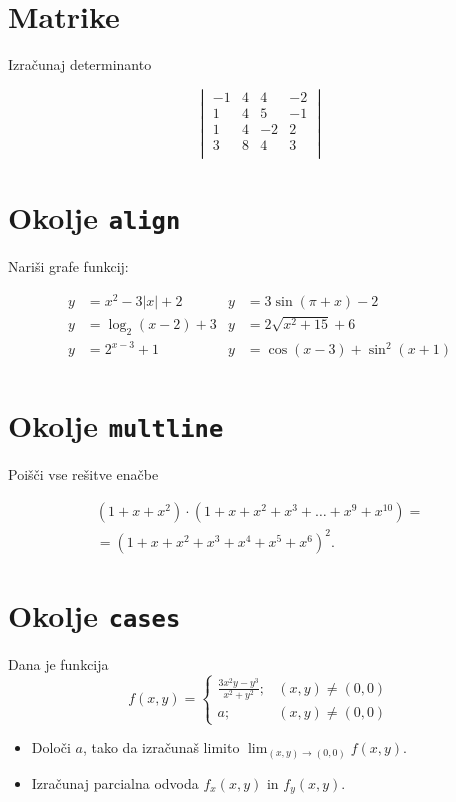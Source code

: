 \documentclass[a4paper,12pt]{article}
\begin{document}
\section*{Matrike}
Izračunaj determinanto
 
 \[\begin{vmatrix}
    -1 & 4 & 4 & -2 \\
    1 & 4 & 5 & -1 \\
    1 & 4 & -2 & 2 \\
    3 & 8 & 4 & 3 \\
 \end{vmatrix}\]
\section*{Okolje \texttt{align}}
Nariši grafe funkcij:


\begin{align*}
   y &= x^2 - 3|x| + 2    & y &= 3 \sin(\pi+x) - 2\\
   y &= \log_2(x-2) + 3   & y &= 2 \sqrt{x^2+15} + 6\\
   y &= 2^{x-3} + 1       & y &= \cos(x-3) + \sin^2(x+1)\\
\end{align*}


\section*{Okolje \texttt{multline}}
Poišči vse rešitve enačbe


\begin{multline*}
   (1+x+x^2) \cdot (1+x+x^2+x^3+\ldots+x^9+x^{10}) =\\
   =(1+x+x^2+x^3+x^4+x^5+x^6)^2.
\end{multline*}


\section*{Okolje \texttt{cases}}
Dana je funkcija
$$f(x,y)=
\begin{cases} 
   \frac{3x^2y-y^3}{x^2+y^2};&(x,y)\neq(0,0)\\
   a;&(x,y)\neq(0,0)
\end{cases}$$

\begin{itemize}
\item Določi \(a\), tako da izračunaš limito \( \lim_{(x,y)\to(0,0)} f(x,y) \).
\item Izračunaj parcialna odvoda \(f_x(x,y)\) in \(f_y(x,y)\).
\end{itemize}
\end{document}
